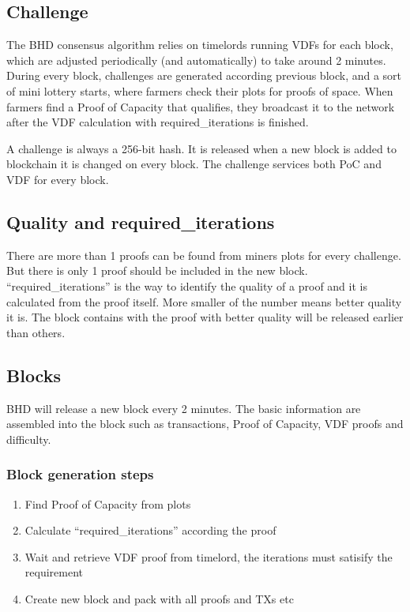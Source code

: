 \subsection{Challenge}
\begin{flushleft}
    The BHD consensus algorithm relies on timelords running VDFs for each block, which are adjusted periodically (and automatically) to take around 2 minutes. During every block, challenges are generated according previous block, and a sort of mini lottery starts, where farmers check their plots for proofs of space. When farmers find a Proof of Capacity that qualifies, they broadcast it to the network after the VDF calculation with required\_iterations is finished.
\end{flushleft}
\begin{flushleft}
    A challenge is always a 256-bit hash. It is released when a new block is added to blockchain it is changed on every block. The challenge services both PoC and VDF for every block.
\end{flushleft}
\subsection{Quality and required\_iterations}
\begin{flushleft}
    There are more than 1 proofs can be found from miners plots for every challenge. But there is only 1 proof should be included in the new block. ``required\_iterations'' is the way to identify the quality of a proof and it is calculated from the proof itself. More smaller of the number means better quality it is. The block contains with the proof with better quality will be released earlier than others.
\end{flushleft}
\subsection{Blocks}
\begin{flushleft}
    BHD will release a new block every 2 minutes. The basic information are assembled into the block such as transactions, Proof of Capacity, VDF proofs and difficulty.
\end{flushleft}
\subsubsection{Block generation steps}
\begin{enumerate}
    \item Find Proof of Capacity from plots
    \item Calculate ``required\_iterations'' according the proof
    \item Wait and retrieve VDF proof from timelord, the iterations must satisify the requirement
    \item Create new block and pack with all proofs and TXs etc
\end{enumerate}

